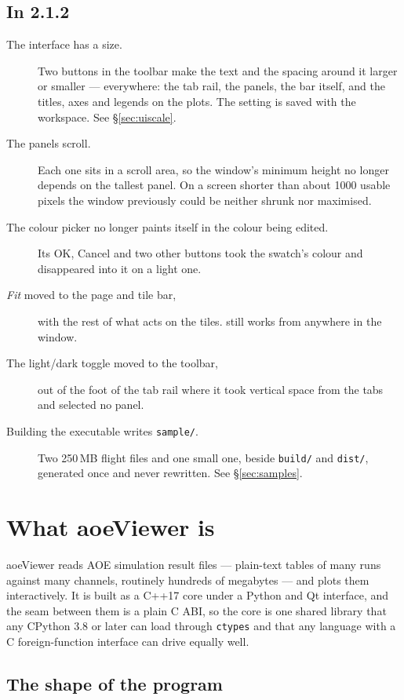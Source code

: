 \documentclass[11pt,a4paper,oneside]{report}
\newcommand{\appver}{2.1.2}
\newcommand{\code}[1]{\texttt{#1}}
\newcommand{\key}[1]{\textsf{\small\fbox{#1}}}
\begin{document}
\section{In \appver}

\begin{description}
\item[The interface has a size.] Two buttons in the toolbar make the text and the
  spacing around it larger or smaller --- everywhere: the tab rail, the
  panels, the bar itself, and the titles, axes and legends on the plots. The
  setting is saved with the workspace. See \S\ref{sec:uiscale}.
\item[The panels scroll.] Each one sits in a scroll area, so the window's minimum
  height no longer depends on the tallest panel. On a screen shorter than
  about 1000 usable pixels the window previously could be neither shrunk nor
  maximised.
\item[The colour picker no longer paints itself in the colour being edited.] Its OK,
  Cancel and two other buttons took the swatch's colour and disappeared into
  it on a light one.
\item[\emph{Fit} moved to the page and tile bar,] with the rest of what acts on the
  tiles. \key{Ctrl+0} still works from anywhere in the window.
\item[The light/dark toggle moved to the toolbar,] out of the foot of the tab rail
  where it took vertical space from the tabs and selected no panel.
\item[Building the executable writes \code{sample/}.] Two 250\,MB flight files and one
  small one, beside \code{build/} and \code{dist/}, generated once and never
  rewritten. See \S\ref{sec:samples}.
\end{description}

\chapter{What aoeViewer is}

aoeViewer reads AOE simulation result files --- plain-text tables of many runs
against many channels, routinely hundreds of megabytes --- and plots them
interactively. It is built as a C++17 core under a Python and Qt interface, and
the seam between them is a plain C ABI, so the core is one shared library that
any CPython 3.8 or later can load through \code{ctypes} and that any language
with a C foreign-function interface can drive equally well.

\section{The shape of the program}
\end{document}
